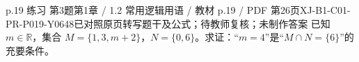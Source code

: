 \par\noindent\begin{minipage}{\linewidth}
\begin{bankitem}{p.19 练习 第3题}{第1章 / 1.2 常用逻辑用语 / 教材 p.19 / PDF 第26页}{XJ-B1-C01-PR-P019-Y0648}{已对照原页转写题干及公式；待教师复核；未制作答案}
已知 $m\in\mathbb R$，集合 $M=\{1,3,m+2\}$，$N=\{0,6\}$。求证：“$m=4$”是“$M\cap N=\{6\}$”的充要条件。
\end{bankitem}
\end{minipage}\par\medskip
